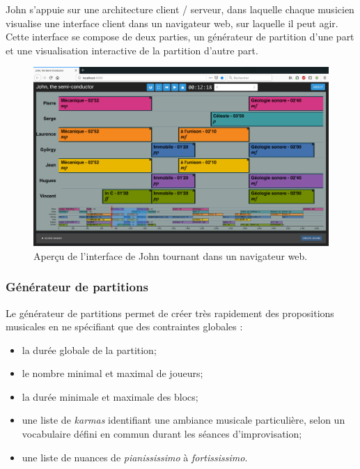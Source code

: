 \noindent John s'appuie sur une architecture client / serveur, dans laquelle chaque musicien visualise une interface client dans un navigateur web, sur laquelle il peut agir. Cette interface se compose de deux parties, un générateur de partition d'une part et une visualisation interactive de la partition d'autre part.
\begin{figure}[!htbp]
	\includegraphics[width=\textwidth]{gfx/notation/John-snapshot.png}
	\caption[John : capture écran de l'interface client]{Aperçu de l'interface de John tournant dans un navigateur web.}
	\label{fig:notation:john-snapshot}
\end{figure}
\subsubsection{Générateur de partitions}

\noindent Le générateur de partitions permet de créer très rapidement des propositions musicales en ne spécifiant que des contraintes globales :
\vspace{-1em}
\begin{itemize}[noitemsep]
	\item la durée globale de la partition;
	\item le nombre minimal et maximal de joueurs;
	\item la durée minimale et maximale des blocs;
	\item une liste de \textit{karmas} identifiant une ambiance musicale particulière, selon un vocabulaire défini en commun durant les séances d'improvisation;
	\item une liste de nuances de \textit{pianississimo} à \textit{fortississimo}.
\end{itemize}

